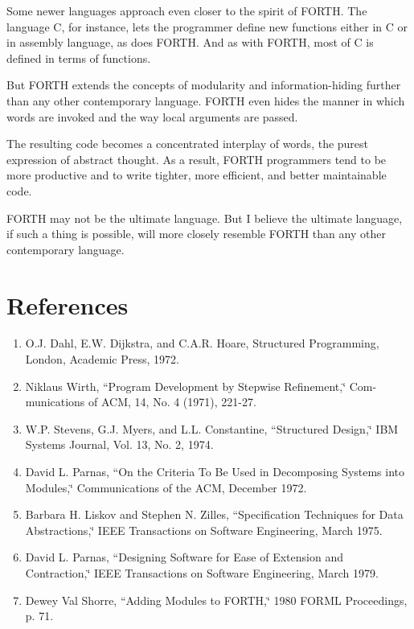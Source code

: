 Some newer languages approach even closer to the spirit of FORTH.
The language C, for instance, lets the programmer define new functions
either in C or in assembly language, as does FORTH. And as with FORTH,
most of C is defined in terms of functions.

But FORTH extends the concepts of modularity and information-hiding
further than any other contemporary language. FORTH even hides the
manner in which words are invoked and the way local arguments are
passed.

The resulting code becomes a concentrated interplay of words, the
purest expression of abstract thought. As a result, FORTH programmers
tend to be more productive and to write tighter, more efficient, and
better maintainable code.

FORTH may not be the ultimate language. But I believe the ultimate
language, if such a thing is possible, will more closely resemble
FORTH than any other contemporary language.


\section{References}
\begin{enumerate}
\item O.J. Dahl, E.W. Dijkstra, and C.A.R. Hoare, Structured Programming,
London, Academic Press, 1972.
\item Niklaus Wirth, {}``Program Development by Stepwise Refinement,\char`\"{}
Com- munications of ACM, 14, No. 4 (1971), 221-27.
\item W.P. Stevens, G.J. Myers, and L.L. Constantine, {}``Structured Design,\char`\"{}
IBM Systems Journal, Vol. 13, No. 2, 1974.
\item David L. Parnas, {}``On the Criteria To Be Used in Decomposing Systems
into Modules,\char`\"{} Communications of the ACM, December 1972.
\item Barbara H. Liskov and Stephen N. Zilles, {}``Specification Techniques
for Data Abstractions,\char`\"{} IEEE Transactions on Software Engineering,
March 1975.
\item David L. Parnas, {}``Designing Software for Ease of Extension and
Contraction,\char`\"{} IEEE Transactions on Software Engineering,
March 1979.
\item Dewey Val Shorre, {}``Adding Modules to FORTH,\char`\"{} 1980 FORML
Proceedings, p. 71.
\end{enumerate}
